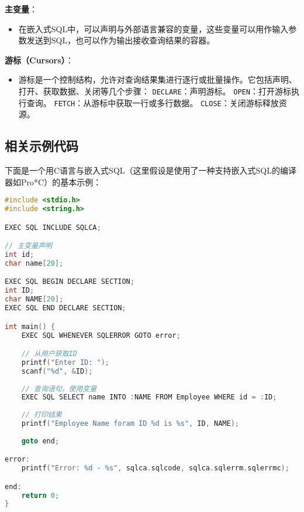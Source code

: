 \textbf{主变量}：
\begin{itemize}
    \item 在嵌入式SQL中，可以声明与外部语言兼容的变量，这些变量可以用作输入参数发送到SQL，也可以作为输出接收查询结果的容器。
\end{itemize}

\textbf{游标（Cursors）}：
\begin{itemize}
    \item 游标是一个控制结构，允许对查询结果集进行逐行或批量操作。它包括声明、打开、获取数据、关闭等几个步骤：
        \subitem \texttt{DECLARE}：声明游标。
        \subitem \texttt{OPEN}：打开游标执行查询。
        \subitem \texttt{FETCH}：从游标中获取一行或多行数据。
        \subitem \texttt{CLOSE}：关闭游标释放资源。
\end{itemize}

\subsection{相关示例代码}
下面是一个用C语言与嵌入式SQL（这里假设是使用了一种支持嵌入式SQL的编译器如Pro*C）的基本示例：

\begin{lstlisting}[language=C]
#include <stdio.h>
#include <string.h>

EXEC SQL INCLUDE SQLCA;

// 主变量声明
int id;
char name[20];

EXEC SQL BEGIN DECLARE SECTION;
int ID;
char NAME[20];
EXEC SQL END DECLARE SECTION;

int main() {
    EXEC SQL WHENEVER SQLERROR GOTO error;

    // 从用户获取ID
    printf("Enter ID: ");
    scanf("%d", &ID);
    
    // 查询语句，使用变量
    EXEC SQL SELECT name INTO :NAME FROM Employee WHERE id = :ID;
    
    // 打印结果
    printf("Employee Name foram ID %d is %s", ID, NAME);
    
    goto end;

error:
    printf("Error: %d - %s", sqlca.sqlcode, sqlca.sqlerrm.sqlerrmc);

end:
    return 0;
}
\end{lstlisting}